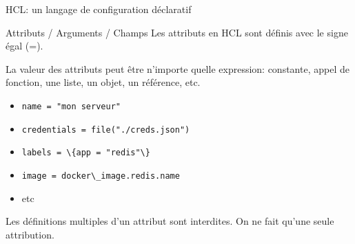 \documentclass[aspectratio=169,10pt]{beamer}
\begin{document}

\begin{frame}{HCL: un langage de configuration déclaratif}

\begin{alertblock}{Attributs / Arguments / Champs}
Les attributs en HCL sont définis avec le signe \alert{égal} (\alert{=}).

La valeur des attributs peut être n'importe quelle expression: constante, appel de fonction, une liste, un objet, un référence, etc.

\begin{itemize}
    \item \lstinline[language=HCL]!name = "mon serveur"!
    \item \lstinline[language=HCL]!credentials = file("./creds.json")!
    \item \lstinline[language=HCL]!labels = \{app = "redis"\}!
    \item \lstinline[language=HCL]!image = docker\_image.redis.name!
    \item etc
\end{itemize}

\end{alertblock}

Les définitions \alert{multiples} d'un attribut sont \alert{interdites}. On ne fait qu'une seule attribution.

\end{frame}
\end{document}
